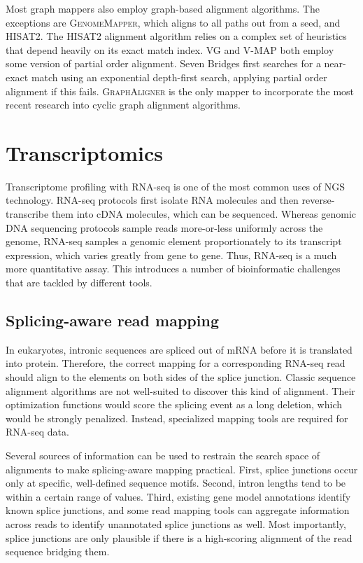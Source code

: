 \documentclass[11pt]{ucthesis}
\begin{document}
Most graph mappers also employ graph-based alignment algorithms. 
The exceptions are \textsc{GenomeMapper}, which aligns to all paths out from a seed, and \textsc{HISAT2}.
The \textsc{HISAT2} alignment algorithm relies on a complex set of heuristics that depend heavily on its exact match index.
\textsc{VG} and \textsc{V-MAP} both employ some version of partial order alignment.
Seven Bridges first searches for a near-exact match using an exponential depth-first search, applying partial order alignment if this fails.
\textsc{GraphAligner} is the only mapper to incorporate the most recent research into cyclic graph alignment algorithms.

\section{Transcriptomics}

Transcriptome profiling with RNA-seq is one of the most common uses of NGS technology\cite{mortazavi2008mapping}. RNA-seq protocols first isolate RNA molecules and then reverse-transcribe them into cDNA molecules, which can be sequenced. Whereas genomic DNA sequencing protocols sample reads more-or-less uniformly across the genome, RNA-seq samples a genomic element proportionately to its transcript expression, which varies greatly from gene to gene. Thus, RNA\nobreakdash-seq is a much more quantitative assay. This introduces a number of bioinformatic challenges that are tackled by different tools.

\subsection{Splicing-aware read mapping} 

In eukaryotes, intronic sequences are spliced out of mRNA before it is translated into protein. Therefore, the correct mapping for a corresponding RNA-seq read should align to the elements on both sides of the splice junction. Classic sequence alignment algorithms are not well-suited to discover this kind of alignment. Their optimization functions would score the splicing event as a long deletion, which would be strongly penalized. Instead, specialized mapping tools are required for RNA-seq data\cite{dobin2013star,kim2013tophat2,kim2015hisat}.

Several sources of information can be used to restrain the search space of alignments to make splicing-aware mapping practical. First, splice junctions occur only at specific, well-defined sequence motifs\cite{burset2000analysis}. Second, intron lengths tend to be within a certain range of values\cite{gotoh2018modeling}. Third, existing gene model annotations identify known splice junctions\cite{dobin2013star}, and some read mapping tools can aggregate information across reads to identify unannotated splice junctions as well\cite{kim2013tophat2}. Most importantly, splice junctions are only plausible if there is a high-scoring alignment of the read sequence bridging them.
\end{document}
